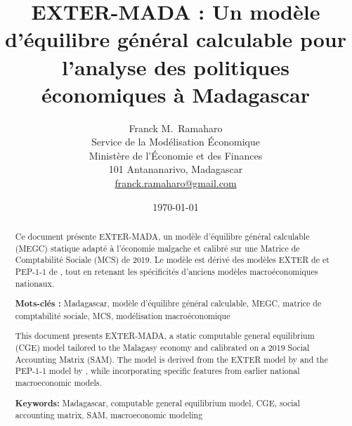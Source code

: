 \documentclass[11pt,a4paper]{article}
\title{EXTER-MADA : Un modèle d'équilibre général calculable pour l'analyse des politiques économiques à Madagascar}
\author{Franck M.~Ramaharo\orcidlink{0000-0003-0340-170X}\\
	\small Service de la Modélisation Économique\\
	\small Ministère de l'Économie et des Finances\\ 
	\small 101 Antananarivo, Madagascar\\
	\small\href{mailto:franck.ramaharo@gmail.com}{\sffamily franck.ramaharo@gmail.com}\\
}
\date{\today}
\begin{document}
	\maketitle
	
	
	\begin{abstract}
		Ce document présente EXTER-MADA, un modèle d’équilibre général calculable (MEGC) statique adapté à l’économie malgache et calibré sur une Matrice de Comptabilité Sociale (MCS) de 2019. Le modèle est dérivé des modèles EXTER de \cite{Decaluweetal2001} et PEP-1-1 de \cite{Decaluweetal2013}, tout en retenant les spécificités d'anciens modèles macroéconomiques nationaux.  
		
		\bigskip
		
		\textbf{Mots-clés :} Madagascar, modèle d’équilibre général calculable, MEGC, matrice de comptabilité sociale, MCS, modélisation macroéconomique
	\end{abstract}	
	
	
	\begin{abstract}
		
		This document presents EXTER-MADA, a static computable general equilibrium (CGE) model tailored to the Malagasy economy and calibrated on a 2019 Social Accounting Matrix (SAM). The model is derived from the EXTER model by \cite{Decaluweetal2001} and the PEP-1-1 model by \cite{Decaluweetal2013}, while incorporating specific features from earlier national macroeconomic models.
		
		\bigskip
		
		\textbf{Keywords:} Madagascar,  computable general equilibrium model, CGE, social accounting matrix, SAM, macroeconomic modeling
	\end{abstract}
	
\end{document}
